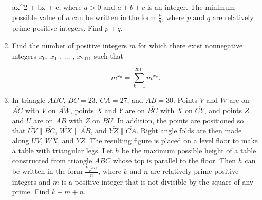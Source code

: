 \documentclass{article}
\begin{document}
\begin{enumerate}[label=\arabic*., itemsep=0.5em]
ax^2 + bx + c\), where \(a > 0\) and \(a + b + c\) is an integer.  The minimum possible value of \(a\) can be written in the form \(\frac{p}{q}\), where \(p\) and \(q\) are relatively prime positive integers.  Find \(p + q\).\par \vspace{0.5em}\item Find the number of positive integers \(m\) for which there exist nonnegative integers \(x_0\), \(x_1\) , \(\dots\) , \(x_{2011}\) such that

\begin{equation*}
m^{x_0} = \sum_{k = 1}^{2011} m^{x_k}.
\end{equation*}
\par \vspace{0.5em}\item In triangle \(ABC\), \(BC = 23\), \(CA = 27\), and \(AB = 30\).  Points \(V\) and \(W\) are on \(\overline{AC}\) with \(V\) on \(\overline{AW}\), points \(X\) and \(Y\) are on \(\overline{BC}\) with \(X\) on \(\overline{CY}\), and points \(Z\) and \(U\) are on \(\overline{AB}\) with \(Z\) on \(\overline{BU}\).  In addition, the points are positioned so that \(\overline{UV} \parallel \overline{BC}\), \(\overline{WX} \parallel \overline{AB}\), and \(\overline{YZ} \parallel \overline{CA}\).  Right angle folds are then made along \(\overline{UV}\), \(\overline{WX}\), and \(\overline{YZ}\).  The resulting figure is placed on a level floor to make a table with triangular legs.  Let \(h\) be the maximum possible height of a table constructed from triangle \(ABC\) whose top is parallel to the floor.  Then \(h\) can be written in the form \(\frac{k \sqrt{m}}{n}\), where \(k\) and \(n\) are relatively prime positive integers and \(m\) is a positive integer that is not divisible by the square of any prime.  Find \(k + m + n\).


\end{enumerate}
\end{document}
